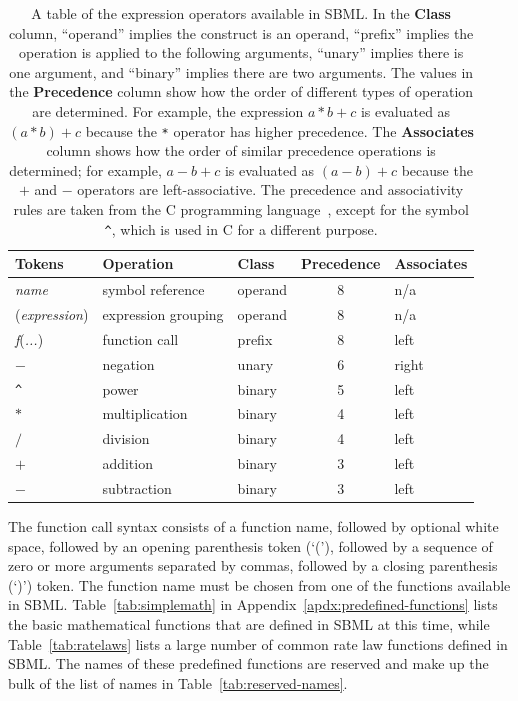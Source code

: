 \documentclass[10pt]{cekarticle}
\newcommand{\vref}[1]{\ref{#1}}
\begin{document}
\begin{table}[tbh]
  \vspace*{8pt}
  \begin{center}
    \begin{tabular}{lllcl}
      \toprule
      \textbf{Tokens} & \textbf{Operation} & \textbf{Class} & \textbf{Precedence} & \textbf{Associates} \\
      \midrule
      \emph{name} & symbol reference & operand & 8 & n/a \\
      (\emph{expression}) & expression grouping & operand & 8 & n/a\\
      \emph{f}(\emph{...}) & function call & prefix & 8 & left\\
      $-$ & negation & unary & 6 & right\\
      \verb|^| & power & binary & 5 & left \\
      $*$ & multiplication & binary & 4 & left\\
      $/$ & division & binary & 4 & left\\
      $+$ & addition & binary & 3 & left\\
      $-$ & subtraction & binary & 3 & left\\
      \bottomrule
    \end{tabular}
    \vspace*{-3pt}
  \end{center}
  \caption{A table of the expression operators available in SBML.  In the
    \textbf{\textrm{Class}} column, ``operand'' implies the construct is an
    operand, ``prefix'' implies the operation is applied to the following
    arguments, ``unary'' implies there is one argument, and ``binary''
    implies there are two arguments.  The values in the
    \textbf{\textrm{Precedence}} column show how the order of different
    types of operation are determined.  For example, the expression $a * b
    + c$ is evaluated as $(a * b) + c$ because the \texttt{*} operator has
    higher precedence.  The \textbf{\textrm{Associates}} column shows how
    the order of similar precedence operations is determined; for example,
    $a - b + c$ is evaluated as $(a - b) + c$ because the $+$ and $-$
    operators are left-associative.  The precedence and associativity rules
    are taken from the C programming language~\protect\citep{harbison:1995},
    except for the symbol \texttt{\^}, which is used in C for a different
    purpose.}
  \label{tab:operators}
\end{table}

The function call syntax consists of a function name, followed by optional
white space, followed by an opening parenthesis token (`('), followed by a
sequence of zero or more arguments separated by commas, followed by a
closing parenthesis (`)') token.  The function name must be chosen from one
of the functions available in SBML.  Table~\ref{tab:simplemath} in
Appendix~\ref{apdx:predefined-functions} lists the basic mathematical
functions that are defined in SBML at this time, while
Table~\ref{tab:ratelaws} lists a large number of common rate law functions
defined in SBML.  The names of these predefined functions are reserved and
make up the bulk of the list of names in
Table~\vref{tab:reserved-names}.
\end{document}
